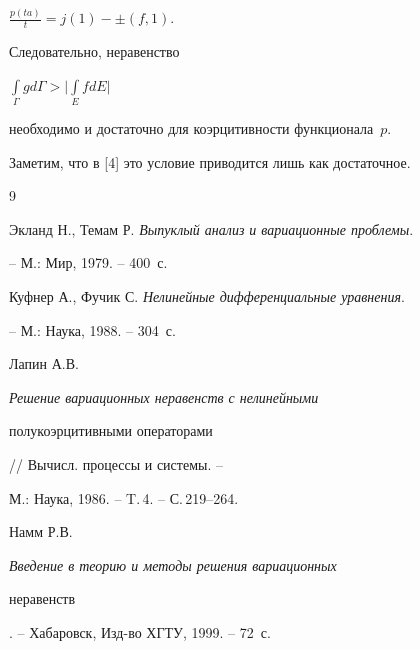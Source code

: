 $\frac{p(ta)}{t} = j(1) - \pm (f,1)$.


Следовательно, неравенство


$\int\limits_\Gamma gd\Gamma >\Big|\int\limits_EfdE\Big|$


необходимо и достаточно для коэрцитивности функционала~$p$.


Заметим, что в [4] это условие приводится лишь как достаточное.





\begin{thebibliography}{9}







Экланд Н., Темам Р. {\it Выпуклый анализ и вариационные проблемы}.


-- М.: Мир, 1979. -- 400~с.




Куфнер А., Фучик С. {\it Нелинейные дифференциальные уравнения}.


-- М.: Наука, 1988. -- 304~с.




Лапин А.В. {\it Решение вариационных неравенств с нелинейными 


полукоэрцитивными операторами} // Вычисл. процессы и системы. -- 


М.: Наука, 1986. -- T.\,4. -- С.\,219--264.




Намм Р.В. {\it Введение в теорию и методы решения вариационных


неравенств}. -- Хабаровск, Изд-во ХГТУ, 1999. -- 72~с.





\end{thebibliography}





\vskip 2cm












\label{end}





